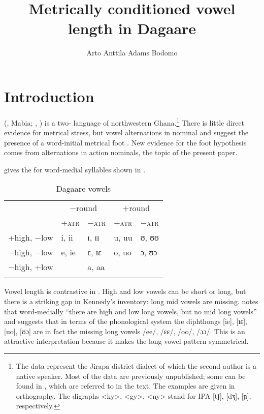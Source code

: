 \documentclass[output=paper
,newtxmath
,modfonts
,nonflat]{langsci/langscibook}
\author{Arto Anttila\affiliation{Stanford University} \lastand Adams Bodomo\affiliation{University of Vienna}}
\title{Metrically conditioned
vowel length in Dagaare}
\begin{document}
\maketitle
\section{Introduction}


 (, Mabia; \citealt{Naden1989}, \citealt{Bodomo1997}) is a two- language of northwestern Ghana.\footnote{The data represent the Jirapa district dialect of which the second author is a native speaker. Most of the data are previously unpublished; some can be found in \citep{Kennedy1966, Bodomo1997, Anttila&Bodomo2009}, which are referred to in the text. The examples are given in  orthography. The digraphs <ky>, <gy>, <ny> stand for IPA [tʃ], [dʒ], [ɲ], respectively.} There is little direct evidence for metrical stress, but vowel alternations in nominal and  suggest the presence of a word-initial metrical foot  \citep{Anttila&Bodomo2009}. New evidence for the foot hypothesis comes from  alternations in action nominals, the topic of the present paper.



\citet[9]{Kennedy1966} gives the  for  word-medial syllables shown in . 

\begin{table}
\begin{tabularx}{\textwidth}{XXXXX}
\lsptoprule
 & \multicolumn{2}{c}{{$-$round}} & \multicolumn{2}{c}{{$+$round}}\\
 & +\textsc{atr}  & $-$\textsc{atr} & +\textsc{atr} & $-$\textsc{atr}\\
\midrule
+high, $-$low & i, ii & ɪ, ɪɪ & u, uu & ʊ, ʊʊ\\
$-$high, $-$low & e, ie & ɛ, ɪɛ & o, uo & ɔ, ʊɔ\\
$-$high, +low &  & a, aa &  & \\
\lspbottomrule
\end{tabularx}
\caption{Dagaare vowels \citep{Kennedy1966}}
\label{tab:anttila:1}
\end{table}


Vowel length is contrastive in . High and low vowels can be short or long, but there is a striking gap in Kennedy’s inventory: long mid vowels are missing. \citet[8]{Kennedy1966} notes that word-medially “there are high and low long vowels, but no mid long vowels” and suggests that in terms of the phonological system the diphthongs [ie], [ɪɛ], [uo], [ʊɔ] are in fact the missing long vowels /ee/, /ɛɛ/, /oo/, /ɔɔ/. This is an attractive interpretation because it makes the long vowel pattern symmetrical. 
\end{document}
